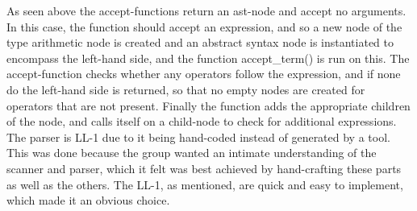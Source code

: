 As seen above the accept-functions return an \ac{ast}-node and accept no arguments. In this case, the function should accept an expression, and so a new node of the type arithmetic node is created and an abstract syntax node is instantiated to encompass the left-hand side, and the function accept\_term() is run on this. 
\vspace{10pt}
The accept-function checks whether any operators follow the expression, and if none do the left-hand side is returned, so that no empty nodes are created for operators that are not present.
\vspace{10pt}
Finally the function adds the appropriate children of the node, and calls itself on a child-node to check for additional expressions.
\vspace{10pt}
The parser is LL-1 due to it being hand-coded instead of generated by a tool. This was done because the group wanted an intimate understanding of the scanner and parser, which it felt was best achieved by hand-crafting these parts as well as the others. The LL-1, as mentioned, are quick and easy to implement, which made it an obvious choice.